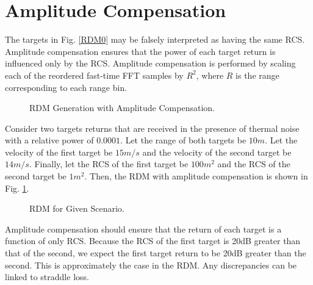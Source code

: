 \documentclass[conference]{IEEEtran}
\begin{document}
\section{Amplitude Compensation}
\label{amp_comp_section}
The targets in Fig. \ref{RDM0} may be falsely interpreted as having the same RCS. Amplitude compensation ensures that the power of each target return is influenced only by the RCS. Amplitude compensation is performed by scaling each of the reordered fast-time FFT samples by $R^2$, where $R$ is the range corresponding to each range bin.
\begin{figure}[H]
\centerline{}
\caption{RDM Generation with Amplitude Compensation.}
\end{figure}
Consider two targets returns that are received in the presence of thermal noise with a relative power of $0.0001$. Let the range of both targets be $10m$. Let the velocity of the first target be $15m/s$ and the velocity of the second target be $14m/s$. Finally, let the RCS of the first target be $100m^2$ and the RCS of the second target be $1m^2$. Then, the RDM with amplitude compensation is shown in Fig. \ref{RDM1}.
\begin{figure}[H]
\centerline{}
\caption{RDM for Given Scenario.}
\label{RDM1}
\end{figure}
Amplitude compensation should ensure that the return of each target is a function of only RCS. Because the RCS of the first target is 20dB greater than that of the second, we expect the first target return to be 20dB greater than the second. This is approximately the case in the RDM. Any discrepancies can be linked to straddle loss.
\end{document}
